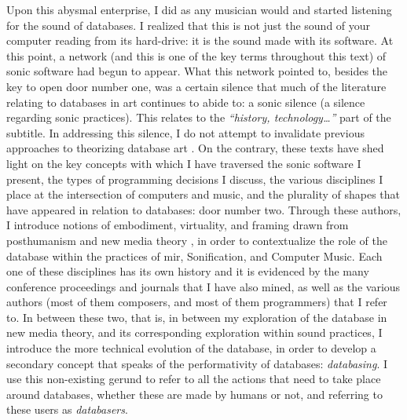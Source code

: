 Upon this abysmal enterprise, I did as any musician would and started listening for the sound of databases. I realized that this is not just the sound of your computer reading from its hard-drive: it is the sound made with its software. At this point, a network (and this is one of the key terms throughout this text) of sonic software had begun to appear. What this network pointed to, besides the key to open door number one, was a certain silence that much of the literature relating to databases in art continues to abide to: a sonic silence (a silence regarding sonic practices). This relates to the \textit{``history, technology\dots''} part of the subtitle. In addressing this silence, I do not attempt to invalidate previous approaches to theorizing database art \parencites{Man01:The}{Ves07:Dat}. On the contrary, these texts have shed light on the key concepts with which I have traversed the sonic software I present, the types of programming decisions I discuss, the various disciplines I place at the intersection of computers and music, and the plurality of shapes that have appeared in relation to databases: door number two. Through these authors, I introduce notions of embodiment, virtuality, and framing drawn from posthumanism \parencite{Hay99:How} and new media theory \parencite{Han04:New}, in order to contextualize the role of the database within the practices of \gls{mir}, Sonification, and Computer Music. Each one of these disciplines has its own history and it is evidenced by the many conference proceedings and journals that I have also mined, as well as the various authors (most of them composers, and most of them programmers) that I refer to. In between these two, that is, in between my exploration of the database in new media theory, and its corresponding exploration within sound practices, I introduce the more technical evolution of the database, in order to develop a secondary concept that speaks of the performativity of databases: \textit{databasing}. I use this non-existing gerund to refer to all the actions that need to take place around databases, whether these are made by humans or not, and referring to these users as \textit{databasers}.


